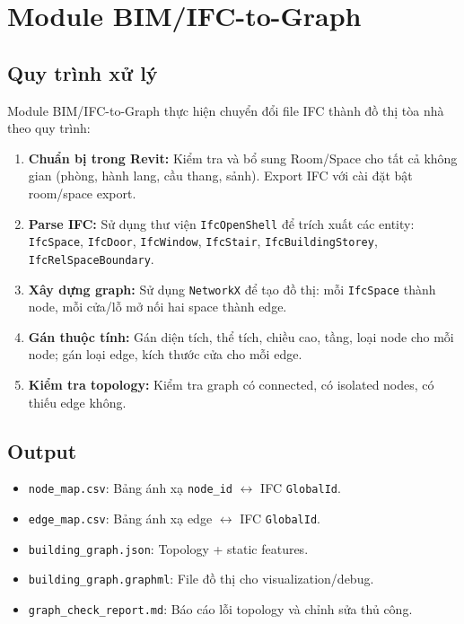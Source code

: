 \section{Module BIM/IFC-to-Graph}
\label{sec:bimtograph}

\subsection{Quy trình xử lý}

Module BIM/IFC-to-Graph thực hiện chuyển đổi file IFC thành đồ thị tòa nhà theo quy trình:

\begin{enumerate}
  \item \textbf{Chuẩn bị trong Revit:} Kiểm tra và bổ sung Room/Space cho tất cả không gian (phòng, hành lang, cầu thang, sảnh). Export IFC với cài đặt bật room/space export.
  \item \textbf{Parse IFC:} Sử dụng thư viện \texttt{IfcOpenShell} để trích xuất các entity: \texttt{IfcSpace}, \texttt{IfcDoor}, \texttt{IfcWindow}, \texttt{IfcStair}, \texttt{IfcBuildingStorey}, \texttt{IfcRelSpaceBoundary}.
  \item \textbf{Xây dựng graph:} Sử dụng \texttt{NetworkX} để tạo đồ thị: mỗi \texttt{IfcSpace} thành node, mỗi cửa/lỗ mở nối hai space thành edge.
  \item \textbf{Gán thuộc tính:} Gán diện tích, thể tích, chiều cao, tầng, loại node cho mỗi node; gán loại edge, kích thước cửa cho mỗi edge.
  \item \textbf{Kiểm tra topology:} Kiểm tra graph có connected, có isolated nodes, có thiếu edge không.
\end{enumerate}

\subsection{Output}

\begin{itemize}
  \item \texttt{node\_map.csv}: Bảng ánh xạ \texttt{node\_id} $\leftrightarrow$ IFC \texttt{GlobalId}.
  \item \texttt{edge\_map.csv}: Bảng ánh xạ edge $\leftrightarrow$ IFC \texttt{GlobalId}.
  \item \texttt{building\_graph.json}: Topology + static features.
  \item \texttt{building\_graph.graphml}: File đồ thị cho visualization/debug.
  \item \texttt{graph\_check\_report.md}: Báo cáo lỗi topology và chỉnh sửa thủ công.
\end{itemize}

